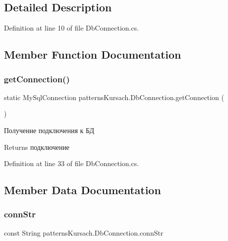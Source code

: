 \subsection{Detailed Description}


Definition at line 10 of file Db\+Connection.\+cs.



\subsection{Member Function Documentation}
\mbox{\label{classpatterns_kursach_1_1_db_connection_a30c5f9ea35c8c1ab85ba540431203590}} 
\subsubsection{\texorpdfstring{get\+Connection()}{getConnection()}}
{\footnotesize\ttfamily static My\+Sql\+Connection patterns\+Kursach.\+Db\+Connection.\+get\+Connection (\begin{DoxyParamCaption}{ }\end{DoxyParamCaption})\hspace{0.3cm}{\ttfamily [static]}}



Получение подключения к БД 

\begin{DoxyReturn}{Returns}
подключение
\end{DoxyReturn}


Definition at line 33 of file Db\+Connection.\+cs.



\subsection{Member Data Documentation}
\mbox{\label{classpatterns_kursach_1_1_db_connection_a99322d824eba94a085cf10f971480b9a}} 
\subsubsection{\texorpdfstring{conn\+Str}{connStr}}
{\footnotesize\ttfamily const String patterns\+Kursach.\+Db\+Connection.\+conn\+Str}

